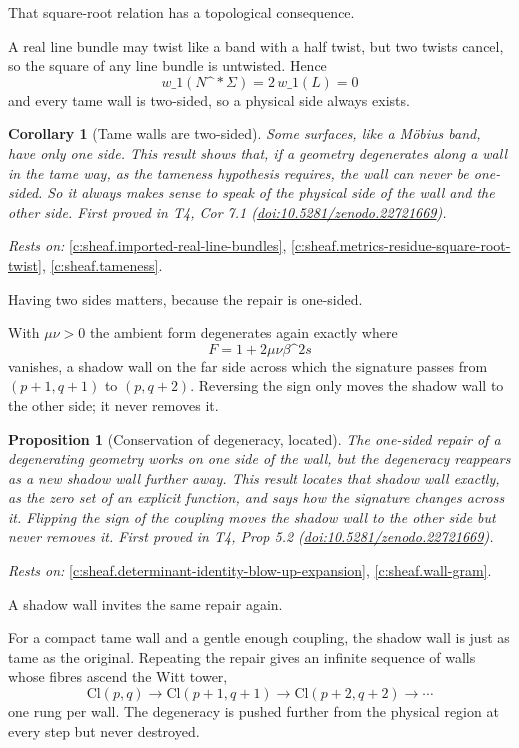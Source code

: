 \documentclass[11pt]{article}
\newtheorem{proposition}[theorem]{Proposition}
\newtheorem{corollary}[theorem]{Corollary}
\theoremstyle{definition}
\theoremstyle{plain}
\providecommand{\Cl}{}\renewcommand{\Cl}{\mathrm{Cl}}
\providecommand{\Sig}{}\renewcommand{\Sig}{\Sigma}
\providecommand{\shL}{}\renewcommand{\shL}{L}
\begin{document}
That square-root relation has a topological consequence.

A real line bundle may twist like a band with a half twist, but two twists cancel, so the square of any line bundle is untwisted. Hence \[ w\_1(N\^{}*\Sig) = 2\,w\_1(\shL) = 0 \] and every tame wall is two-sided, so a physical side always exists.

\begin{corollary}[Tame walls are two-sided]\label{c:sheaf.tame-walls-are-two-sided}
Some surfaces, like a M\"obius band, have only one side. This result shows that, if a geometry degenerates along a wall in the tame way, as the tameness hypothesis requires, the wall can never be one-sided. So it always makes sense to speak of the physical side of the wall and the other side.
\emph{First proved in} T4, Cor 7.1 (\href{https://doi.org/10.5281/zenodo.22721669}{doi:10.5281/zenodo.22721669}).
\end{corollary}
\noindent\emph{Rests on:} \ref{c:sheaf.imported-real-line-bundles}, \ref{c:sheaf.metrics-residue-square-root-twist}, \ref{c:sheaf.tameness}.

Having two sides matters, because the repair is one-sided.

With $\mu\nu > 0$ the ambient form degenerates again exactly where \[ F = 1 + 2\mu\nu\beta\^{}2 s \] vanishes, a shadow wall on the far side across which the signature passes from $(p{+}1,q{+}1)$ to $(p,q{+}2)$. Reversing the sign only moves the shadow wall to the other side; it never removes it.

\begin{proposition}[Conservation of degeneracy, located]\label{c:sheaf.conservation-degeneracy-located}
The one-sided repair of a degenerating geometry works on one side of the wall, but the degeneracy reappears as a new shadow wall further away. This result locates that shadow wall exactly, as the zero set of an explicit function, and says how the signature changes across it. Flipping the sign of the coupling moves the shadow wall to the other side but never removes it.
\emph{First proved in} T4, Prop 5.2 (\href{https://doi.org/10.5281/zenodo.22721669}{doi:10.5281/zenodo.22721669}).
\end{proposition}
\noindent\emph{Rests on:} \ref{c:sheaf.determinant-identity-blow-up-expansion}, \ref{c:sheaf.wall-gram}.

A shadow wall invites the same repair again.

For a compact tame wall and a gentle enough coupling, the shadow wall is just as tame as the original. Repeating the repair gives an infinite sequence of walls whose fibres ascend the Witt tower, \[ \Cl(p,q) \to \Cl(p{+}1,q{+}1) \to \Cl(p{+}2,q{+}2) \to \cdots \] one rung per wall. The degeneracy is pushed further from the physical region at every step but never destroyed.
\end{document}
